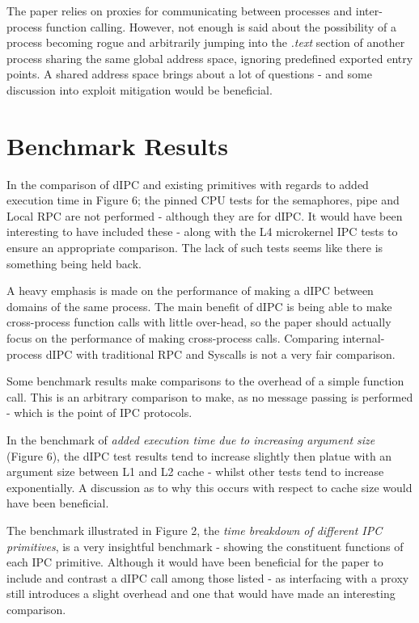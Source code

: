 \documentclass{article}
\begin{document}
The paper relies on proxies for communicating between processes and inter-process function calling. However, not enough is said about the possibility of a process becoming rogue and arbitrarily jumping into the \textit{.text} section of another process sharing the same global address space, ignoring predefined exported entry points. A shared address space brings about a lot of questions - and some discussion into exploit mitigation would be beneficial.


\section*{Benchmark Results}
In the comparison of dIPC and existing primitives with regards to added execution time in Figure 6; the pinned CPU tests for the semaphores, pipe and Local RPC are not performed - although they are for dIPC. It would have been interesting to have included these - along with the L4 microkernel IPC tests to ensure an appropriate comparison. The lack of such tests seems like there is something being held back.

A heavy emphasis is made on the performance of making a dIPC between domains of the same process. The main benefit of dIPC is being able to make cross-process function calls with little over-head, so the paper should actually focus on the performance of making cross-process calls. Comparing internal-process dIPC with traditional RPC and Syscalls is not a very fair comparison.

Some benchmark results make comparisons to the overhead of a simple function call. This is an arbitrary comparison to make, as no message passing is performed - which is the point of IPC protocols.

In the benchmark of \textit{added execution time due to increasing argument size} (Figure 6), the dIPC test results tend to increase slightly then platue with an argument size between L1 and L2 cache - whilst other tests tend to increase exponentially. A discussion as to why this occurs with respect to cache size would have been beneficial.

The benchmark illustrated in Figure 2, the \textit{time breakdown of different IPC primitives}, is a very insightful benchmark - showing the constituent functions of each IPC primitive. Although it would have been beneficial for the paper to include and contrast a dIPC call among those listed - as interfacing with a proxy still introduces a slight overhead and one that would have made an interesting comparison. 


\nocite{*}


\end{document}
